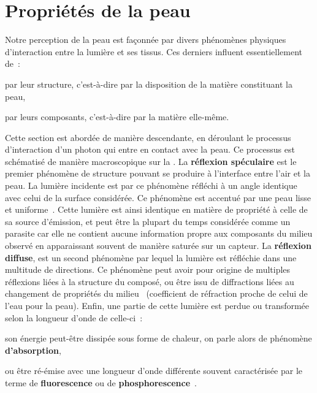 \section{Propriétés de la peau}
Notre perception de la peau est façonnée par divers phénomènes physiques d'interaction entre la lumière et ses tissus. Ces derniers influent essentiellement de~:~
\begin{inlinerate}
    \item par leur structure, c’est-à-dire par la disposition de la matière constituant la peau,
    \item par leurs composants, c’est-à-dire par la matière elle-même.
\end{inlinerate}
Cette section est abordée de manière descendante, en déroulant le processus d'interaction d'un photon qui entre en contact avec la peau. Ce processus est schématisé de manière macroscopique sur la . La \textbf{réflexion spéculaire} est le premier phénomène de structure pouvant se produire à l'interface entre l'air et la peau. La lumière incidente est par ce phénomène réfléchi à un angle identique avec celui de la surface considérée. Ce phénomène est accentué par une peau lisse et uniforme~\cite{Yang2009}. Cette lumière est ainsi identique en matière de propriété à celle de sa source d'émission, et peut être la plupart du temps considérée comme un parasite car elle ne contient aucune information propre aux composants du milieu observé en apparaissant souvent de manière saturée sur un capteur. La \textbf{réflexion diffuse}, est un second phénomène par lequel la lumière est réfléchie dans une multitude de directions. Ce phénomène peut avoir pour origine de multiples réflexions liées à la structure du composé, ou être issu de diffractions liées au changement de propriétés du milieu~\cite{Yang2009} (coefficient de réfraction proche de celui de l'eau pour la peau). Enfin, une partie de cette lumière est perdue ou transformée selon la longueur d'onde de celle-ci~:
\begin{inlinerate}
    \item son énergie peut-être dissipée sous forme de chaleur, on parle alors de phénomène \textbf{d'absorption},
    \item ou être ré-émise avec une longueur d'onde différente souvent caractérisée par le terme de \textbf{fluorescence} ou de \textbf{phosphorescence}~\cite{Kollias2002}.
\end{inlinerate}\par

